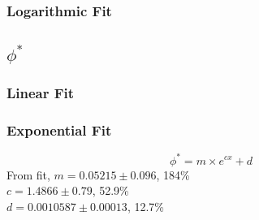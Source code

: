 \documentclass[twocolumn]{article}
\begin{document}
		\subsubsection{Logarithmic Fit}
		\begin{figure}[ht]
			\begin{center}
				\begingroup{}
	  			\resizebox{0.5\textwidth}{!}{%
					
	  			}\endgroup
			\end{center}
		\end{figure}

	\newpage
	\subsection{$\phi^{*}$}
		\subsubsection{Linear Fit}
		\begin{figure}[ht]
			\begin{center}
			\begingroup{}
	  			\resizebox{0.5\textwidth}{!}{%
					
	  			}\endgroup
			\end{center}
		\end{figure}

		\subsubsection{Exponential Fit}
		\begin{figure}[ht]
			\begin{center}
			\begingroup{}
	  			\resizebox{0.5\textwidth}{!}{%
					
	  			}\endgroup
			\end{center}
		\end{figure}
		\[
			\phi^* = m\times e^{c x} + d
		\]
		From fit, $m=0.05215\pm 0.096$, 184\% \\
		$c=1.4866\pm 0.79$, 52.9\% \\
		$d=0.0010587\pm 0.00013$, 12.7\%
\end{document}
